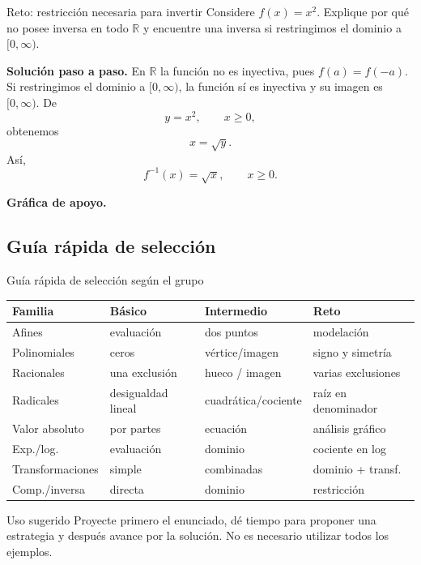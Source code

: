 \documentclass[aspectratio=169,10pt]{beamer}
\newcommand{\R}{\mathbb{R}}
\begin{document}
\begin{frame}{Reto: restricción necesaria para invertir}
Considere $f(x)=x^2$. Explique por qué no posee inversa en todo $\R$ y encuentre una inversa si restringimos el dominio a $[0,\infty)$.

\textbf{Solución paso a paso.} En $\R$ la función no es inyectiva, pues $f(a)=f(-a)$. Si restringimos el dominio a $[0,\infty)$, la función sí es inyectiva y su imagen es $[0,\infty)$. De
\[
y=x^2,\qquad x\ge0,
\]
obtenemos
\[
x=\sqrt{y}.
\]
Así,
\[
\boxed{f^{-1}(x)=\sqrt{x},\qquad x\ge0}.
\]


\textbf{Gráfica de apoyo.}\medskip
\begin{center}
\end{center}

\end{frame}

\subsection{Guía rápida de selección}
\begin{frame}{Guía rápida de selección según el grupo}
\small
\begin{tabular}{p{}p{}p{}p{}}
\toprule
\textbf{Familia} & \textbf{Básico} & \textbf{Intermedio} & \textbf{Reto}\\
\midrule
Afines & evaluación & dos puntos & modelación\\
Polinomiales & ceros & vértice/imagen & signo y simetría\\
Racionales & una exclusión & hueco / imagen & varias exclusiones\\
Radicales & desigualdad lineal & cuadrática/cociente & raíz en denominador\\
Valor absoluto & por partes & ecuación & análisis gráfico\\
Exp./log. & evaluación & dominio & cociente en log\\
Transformaciones & simple & combinadas & dominio + transf.\\
Comp./inversa & directa & dominio & restricción\\
\bottomrule
\end{tabular}
\vspace{1ex}
\begin{block}{Uso sugerido}
Proyecte primero el enunciado, dé tiempo para proponer una estrategia y después avance por la solución. No es necesario utilizar todos los ejemplos.
\end{block}
\end{frame}
\end{document}
